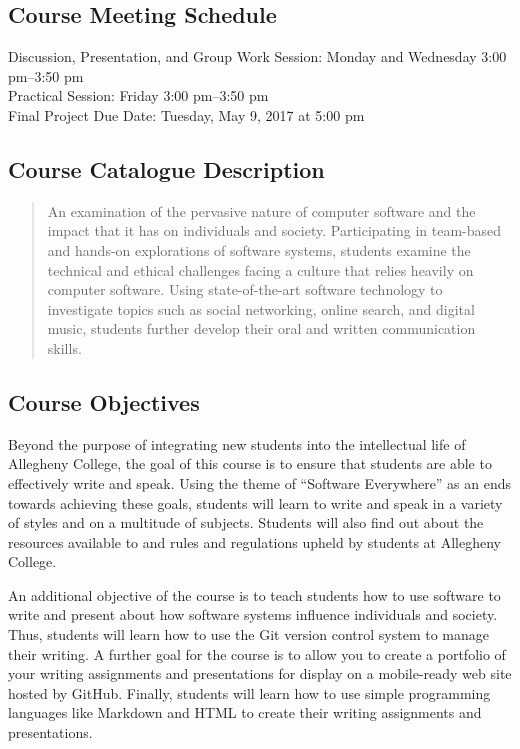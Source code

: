 \subsection*{Course Meeting Schedule}

Discussion, Presentation, and Group Work Session: Monday and Wednesday 3:00 pm--3:50 pm \\
Practical Session: Friday 3:00 pm--3:50 pm \\
Final Project Due Date: Tuesday, May 9, 2017 at 5:00 pm

\subsection*{Course Catalogue Description}

\begin{quote}

  An examination of the pervasive nature of computer software and the impact that it has on individuals and society.
  Participating in team-based and hands-on explorations of software systems, students examine the technical and ethical
  challenges facing a culture that relies heavily on computer software. Using state-of-the-art software technology to
  investigate topics such as social networking, online search, and digital music, students further develop their oral and
  written communication skills.

\end{quote}

\subsection*{Course Objectives}

Beyond the purpose of integrating new students into the intellectual life of Allegheny College, the goal of this course
is to ensure that students are able to effectively write and speak. Using the theme of ``Software Everywhere'' as an
ends towards achieving these goals, students will learn to write and speak in a variety of styles and on a multitude of
subjects. Students will also find out about the resources available to and rules and regulations upheld by students at
Allegheny College.

An additional objective of the course is to teach students how to use software to write and present about how software
systems influence individuals and society. Thus, students will learn how to use the Git version control system to manage
their writing. A further goal for the course is to allow you to create a portfolio of your writing assignments and
presentations for display on a mobile-ready web site hosted by GitHub. Finally, students will learn how to use simple
programming languages like Markdown and HTML to create their writing assignments and presentations.

